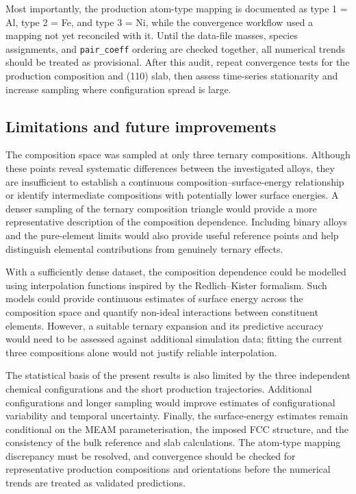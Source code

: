 Most importantly, the production atom-type mapping is documented as type 1 = Al, type 2 = Fe, and type 3 = Ni, while the convergence workflow used a mapping not yet reconciled with it. Until the data-file masses, species assignments, and \texttt{pair\_coeff} ordering are checked together, all numerical trends should be treated as provisional. After this audit, repeat convergence tests for the production composition and (110) slab, then assess time-series stationarity and increase sampling where configuration spread is large.

\subsection{Limitations and future improvements}

The composition space was sampled at only three ternary compositions. Although these points reveal systematic differences between the investigated alloys, they are insufficient to establish a continuous composition--surface-energy relationship or identify intermediate compositions with potentially lower surface energies. A denser sampling of the ternary composition triangle would provide a more representative description of the composition dependence. Including binary alloys and the pure-element limits would also provide useful reference points and help distinguish elemental contributions from genuinely ternary effects.

With a sufficiently dense dataset, the composition dependence could be modelled using interpolation functions inspired by the Redlich--Kister formalism. Such models could provide continuous estimates of surface energy across the composition space and quantify non-ideal interactions between constituent elements. However, a suitable ternary expansion and its predictive accuracy would need to be assessed against additional simulation data; fitting the current three compositions alone would not justify reliable interpolation.

The statistical basis of the present results is also limited by the three independent chemical configurations and the short production trajectories. Additional configurations and longer sampling would improve estimates of configurational variability and temporal uncertainty. Finally, the surface-energy estimates remain conditional on the MEAM parameterisation, the imposed FCC structure, and the consistency of the bulk reference and slab calculations. The atom-type mapping discrepancy must be resolved, and convergence should be checked for representative production compositions and orientations before the numerical trends are treated as validated predictions.